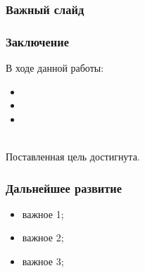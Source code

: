 \documentclass[8pt]{bmstu-pr}
\begin{document}
\begin{frame}
    \frametitle{Важный слайд}

\end{frame}

\begin{frame}
    \frametitle{Заключение}
    В ходе данной работы:
    \begin{itemize}
        \item
        \item
        \item
    \end{itemize}
    ~\\

    Поставленная цель достигнута.
\end{frame}

\begin{frame}
    \frametitle{Дальнейшее развитие}
    \begin{itemize}
        \item важное 1;
        \item важное 2;
        \item важное 3;
    \end{itemize}
    ~\\
\end{frame}
\end{document}
